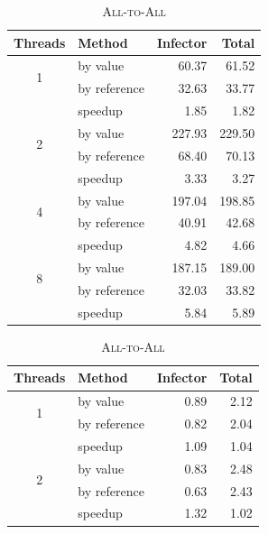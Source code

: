 \begin{table}[!ht]
    \begin{subtable}[h]{0.45\textwidth}
        \centering
        \begin{tabular}{@{}clrr@{}}
            \toprule
            Threads & Method & Infector & Total \\ \midrule
            \multirow{2}{*}{1} & by value & 60.37 & 61.52 \\
             & by reference & 32.63 & 33.77 \\ \hdashline[1pt/1pt]
             & speedup & 1.85 & 1.82 \\ \midrule
            \multirow{2}{*}{2} & by value & 227.93 & 229.50 \\
             & by reference & 68.40 & 70.13 \\ \hdashline[1pt/1pt]
             & speedup & 3.33 & 3.27 \\ \midrule
            \multirow{2}{*}{4} & by value & 197.04 & 198.85 \\
             & by reference & 40.91 & 42.68 \\ \hdashline[1pt/1pt]
             & speedup & 4.82 & 4.66 \\ \midrule
            \multirow{2}{*}{8} & by value & 187.15 & 189.00 \\
             & by reference & 32.03 & 33.82 \\ \hdashline[1pt/1pt]
             & speedup & 5.84 & 5.89 \\ \bottomrule
        \end{tabular}
    \caption{\textsc{All-to-All}}
    \label{tab:basis_standard_parallel_all}
    \end{subtable}
    \hfill
    \begin{subtable}[h]{0.45\textwidth}
        \centering
        \begin{tabular}{@{}clrr@{}}
            \toprule
            Threads & Method & Infector & Total \\ \midrule
            \multirow{2}{*}{1} & by value & 0.89 & 2.12 \\
             & by reference & 0.82 & 2.04 \\ \hdashline[1pt/1pt]
             & speedup & 1.09 & 1.04 \\ \midrule
            \multirow{2}{*}{2} & by value & 0.83 & 2.48 \\
             & by reference & 0.63 & 2.43 \\ \hdashline[1pt/1pt]
             & speedup & 1.32 & 1.02 \\ \midrule

\end{tabular}
\end{subtable}
\end{table}
